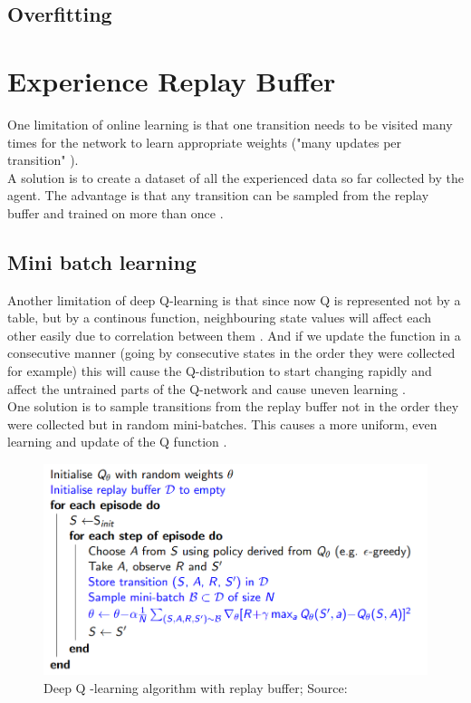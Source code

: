 \subsection{Overfitting}

\section{Experience Replay Buffer}

One limitation of online learning is that one transition needs to be visited many times for the network to learn appropriate weights ("many updates per transition" \cite{lecture_dqn}). \\

A solution is to create a dataset of all the experienced data so far collected by the agent. The advantage is that any transition can be sampled from the replay buffer and trained on more than once \cite{lecture_dqn}. 

\subsection{Mini batch learning }

Another limitation of deep Q-learning is that since now Q is represented not by a table, but by a continous function, neighbouring state values will affect each other easily due to correlation between them \cite{lecture_dqn} . And if 
we update the function in a consecutive manner (going by consecutive states in the order they were collected for example) this will cause the  Q-distribution to start changing rapidly and affect the untrained parts of the Q-network and cause uneven learning \cite{lecture_dqn}. \\

One solution is to sample transitions from the replay buffer not in the order they were collected but in random mini-batches\cite{lecture_dqn}. This causes a more uniform, even learning and update of the Q function \cite{lecture_dqn}.  

\begin{figure}[H]
  \centering
  \includegraphics[scale=0.5]{figures/replay_buffer.PNG}
  \caption{Deep Q -learning algorithm with replay buffer; Source:\cite{lecture_dqn}}
  \label{fig:replay_buffer}
\end{figure}

